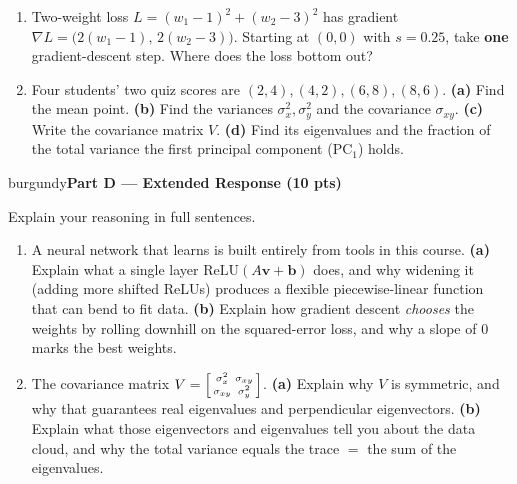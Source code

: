 \documentclass[10pt]{article}
\newcommand{\vv}{\mathbf{v}}
\newcommand{\bb}{\mathbf{b}}
\newcommand{\relu}{\mathrm{ReLU}}
\newcommand{\parthead}[1]{%
  \vspace{6pt}\noindent
  \begin{headlinebox}{burgundy}{\color{white}\bfseries #1}\end{headlinebox}%
  \vspace{4pt}}
\begin{document}
\begin{enumerate}[leftmargin=1.9em, itemsep=12pt]
  \item Two-weight loss $L=(w_1-1)^2+(w_2-3)^2$ has gradient $\nabla L=\big(2(w_1-1),\,2(w_2-3)\big)$.
        Starting at $(0,0)$ with $s=0.25$, take \textbf{one} gradient-descent step. Where does the loss bottom out?
        \vspace{2.8cm}
  \item Four students' two quiz scores are $(2,4),(4,2),(6,8),(8,6)$.
        \textbf{(a)} Find the mean point. \textbf{(b)} Find the variances $\sigma_x^2,\sigma_y^2$ and the covariance $\sigma_{xy}$.
        \textbf{(c)} Write the covariance matrix $V$. \textbf{(d)} Find its eigenvalues and the fraction of the total
        variance the first principal component ($\mathrm{PC}_1$) holds.
        \vspace{3.2cm}
\end{enumerate}

\parthead{Part D --- Extended Response (10 pts)}
Explain your reasoning in full sentences.

\begin{enumerate}[leftmargin=1.9em, itemsep=16pt]
  \item A neural network that learns is built entirely from tools in this course.
        \textbf{(a)} Explain what a single layer $\relu(A\vv+\bb)$ does, and why widening it (adding more shifted ReLUs)
        produces a flexible piecewise-linear function that can bend to fit data.
        \textbf{(b)} Explain how gradient descent \emph{chooses} the weights by rolling downhill on the squared-error loss,
        and why a slope of $0$ marks the best weights.
        \vspace{3.0cm}
  \item The covariance matrix $V=\begin{bsmallmatrix}\sigma_x^2&\sigma_{xy}\\\sigma_{xy}&\sigma_y^2\end{bsmallmatrix}$.
        \textbf{(a)} Explain why $V$ is symmetric, and why that guarantees real eigenvalues and perpendicular eigenvectors.
        \textbf{(b)} Explain what those eigenvectors and eigenvalues tell you about the data cloud, and why the total
        variance equals the trace $=$ the sum of the eigenvalues.
        \vspace{2.8cm}
\end{enumerate}
\end{document}
